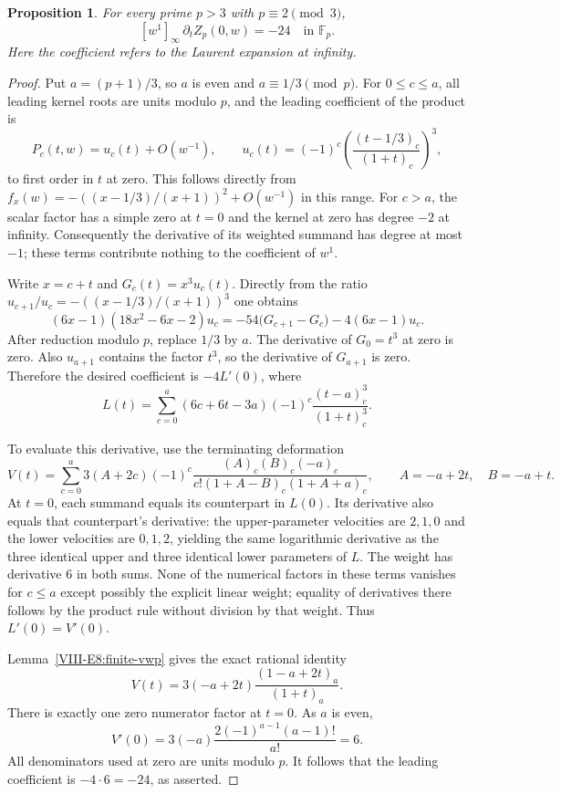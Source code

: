 \documentclass[11pt,letterpaper]{article}
\newtheorem{proposition}[theorem]{Proposition}
\numberwithin{equation}{section}
\begin{document}
\begin{proposition}\label{VIII-E8:leading-infinity-jet}
For every prime $p>3$ with $p\equiv2\pmod3$,
\[
 \boxed{[w^1]_\infty\,\partial_tZ_p(0,w)=-24\quad\text{in }\mathbb F_p.}
\]
Here the coefficient refers to the Laurent expansion at infinity.
\end{proposition}
\begin{proof}
Put $a=(p+1)/3$, so $a$ is even and $a\equiv1/3\pmod p$.
For $0\le c\le a$, all leading kernel roots are units modulo $p$,
and the leading coefficient of the product is
\[
 P_c(t,w)=u_c(t)+O(w^{-1}),\qquad
 u_c(t)=(-1)^c\left(\frac{(t-1/3)_c}{(1+t)_c}\right)^3,
\]
to first order in $t$ at zero. This follows directly from
$f_x(w)=-((x-1/3)/(x+1))^2+O(w^{-1})$ in this range.
For $c>a$, the scalar factor has a simple zero at $t=0$ and the
kernel at zero has degree $-2$ at infinity. Consequently the
derivative of its weighted summand has degree at most $-1$;
these terms contribute nothing to the coefficient of $w^1$.

Write $x=c+t$ and $G_c(t)=x^3u_c(t)$. Directly from the ratio
$u_{c+1}/u_c=-((x-1/3)/(x+1))^3$ one obtains
\[
 (6x-1)(18x^2-6x-2)u_c
 =-54\bigl(G_{c+1}-G_c\bigr)-4(6x-1)u_c.
\]
After reduction modulo $p$, replace $1/3$ by $a$. The derivative
of $G_0=t^3$ at zero is zero. Also $u_{a+1}$ contains the factor
$t^3$, so the derivative of $G_{a+1}$ is zero. Therefore the desired
coefficient is $-4L'(0)$, where
\[
 L(t)=\sum_{c=0}^a(6c+6t-3a)(-1)^c
                 \frac{(t-a)_c^3}{(1+t)_c^3}.
\]

To evaluate this derivative, use the terminating deformation
\[
 V(t)=\sum_{c=0}^a3(A+2c)(-1)^c
       \frac{(A)_c(B)_c(-a)_c}
       {c!(1+A-B)_c(1+A+a)_c},\qquad
 A=-a+2t,\quad B=-a+t.
\]
At $t=0$, each summand equals its counterpart in $L(0)$.
Its derivative also equals that counterpart's derivative: the
upper-parameter velocities are $2,1,0$ and the lower velocities
are $0,1,2$, yielding the same logarithmic derivative as the
three identical upper and three identical lower parameters of
$L$. The weight has derivative $6$ in both sums. None of the
numerical factors in these terms vanishes for $c\le a$ except
possibly the explicit linear weight; equality of derivatives
there follows by the product rule without division by that weight.
Thus $L'(0)=V'(0)$.

Lemma~\ref{VIII-E8:finite-vwp} gives the exact rational identity
\[
 V(t)=3(-a+2t)\frac{(1-a+2t)_a}{(1+t)_a}.
\]
There is exactly one zero numerator factor at $t=0$. As $a$ is even,
\[
 V'(0)=3(-a)\frac{2(-1)^{a-1}(a-1)!}{a!}=6.
\]
All denominators used at zero are units modulo $p$. It follows
that the leading coefficient is $-4\cdot6=-24$, as asserted.
\end{proof}
\end{document}
